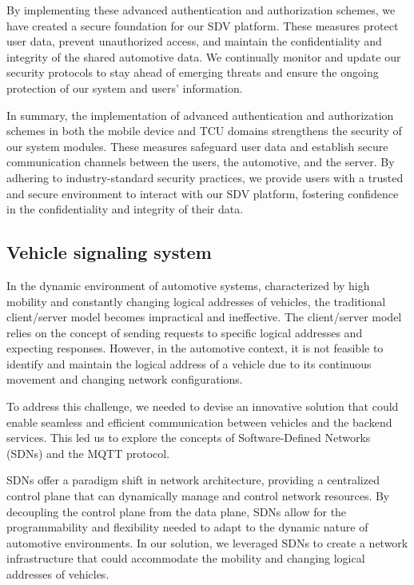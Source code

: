 \documentclass[
12pt,
oneside, 
onehalfspacing, 
nolistspacing, 
parskip, 
chapterinoneline, 
]{AASTCOMPUTER}
\begin{document}
By implementing these advanced authentication and authorization schemes, we have created a secure foundation for our SDV platform. These measures protect user data, prevent unauthorized access, and maintain the confidentiality and integrity of the shared automotive data. We continually monitor and update our security protocols to stay ahead of emerging threats and ensure the ongoing protection of our system and users' information.

In summary, the implementation of advanced authentication and authorization schemes in both the mobile device and TCU domains strengthens the security of our system modules. These measures safeguard user data and establish secure communication channels between the users, the automotive, and the server. By adhering to industry-standard security practices, we provide users with a trusted and secure environment to interact with our SDV platform, fostering confidence in the confidentiality and integrity of their data.

\subsection{Vehicle signaling system}
In the dynamic environment of automotive systems, characterized by high mobility and constantly changing logical addresses of vehicles, the traditional client/server model becomes impractical and ineffective. The client/server model relies on the concept of sending requests to specific logical addresses and expecting responses. However, in the automotive context, it is not feasible to identify and maintain the logical address of a vehicle due to its continuous movement and changing network configurations.

To address this challenge, we needed to devise an innovative solution that could enable seamless and efficient communication between vehicles and the backend services. This led us to explore the concepts of Software-Defined Networks (SDNs) and the MQTT protocol.

SDNs offer a paradigm shift in network architecture, providing a centralized control plane that can dynamically manage and control network resources. By decoupling the control plane from the data plane, SDNs allow for the programmability and flexibility needed to adapt to the dynamic nature of automotive environments. In our solution, we leveraged SDNs to create a network infrastructure that could accommodate the mobility and changing logical addresses of vehicles.
\end{document}
